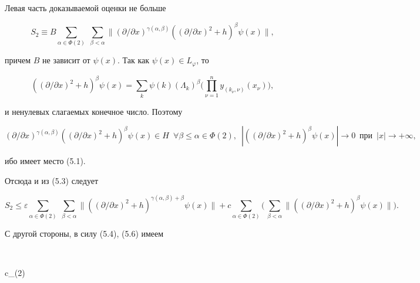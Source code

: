 \begin{pf} 


Левая часть доказываемой оценки не больше 


$$ 


S_2\equiv B\sum_{\alpha\in\Phi(2)}\; 


\sum_{\beta<\alpha}\|(\partial/\partial x)^{\gamma(\alpha,\beta)} 


((\partial/\partial x)^2+h)^\beta\psi(x)\|, 


$$ 


причем $B$ не зависит от $\psi(x)$. Так как $\psi(x)\in L_\varphi$, то 


\begin{equation} 


((\partial/\partial x)^2+h)^\beta\psi(x)=\sum_k\psi(k) 


(\Lambda_k)^\beta\bigg(\prod^n_{\nu=1}y_{(k_\nu,\nu)} 


(x_\nu)\bigg), 


\end{equation} 


и ненулевых слагаемых конечное число. Поэтому 


$$ 


(\partial/\partial x)^{\gamma(\alpha,\beta)} 


((\partial/\partial x)^2+h)^\beta\psi(x)\in H\ \; \forall 


\beta\le\alpha\in\Phi(2), \ \; |((\partial/\partial x)^2 


+h)^\beta\psi(x)|\to 0\ \; 


\text{при}\ \; |x|\to+\infty, 


$$ 


ибо имеет место (5.1). 


Отсюда и из (5.3) следует 


$$ 


S_2\le\varepsilon\sum_{\alpha\in\Phi(2)}\; 


\sum_{\beta<\alpha}\|((\partial/\partial x)^2+ 


h)^{\gamma(\alpha,\beta)+\beta}\psi(x)\|+ 


c\sum_{\alpha\in\Phi(2)}\bigg(\, 


\sum_{\beta<\alpha}\|((\partial/\partial x)^2+h)^\beta 


\psi(x)\|\bigg). 


$$ 


С другой стороны, в силу (5.4), (5.6) имеем 


$$ 


c\sum_{\alpha\in\Phi(2)}\,



\end{pf}
